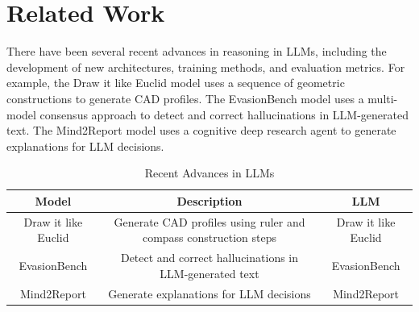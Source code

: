 \documentclass[11pt]{article}
\begin{document}
        \section{Related Work}
        \label{sec:related-work}
        There have been several recent advances in reasoning in LLMs, including the development of new architectures, training methods, and evaluation metrics. For example, the Draw it like Euclid model \cite{li2026drawlikeeuclidteaching} uses a sequence of geometric constructions to generate CAD profiles. The EvasionBench model \cite{ma2026evasionbenchdetectingevasiveanswers} uses a multi-model consensus approach to detect and correct hallucinations in LLM-generated text. The Mind2Report model \cite{cheng2026mind2reportcognitivedeepresearch} uses a cognitive deep research agent to generate explanations for LLM decisions.\\
        \begin{table}[h]
        \centering
        \begin{tabular}{|c|c|c|}
        \hline
        \textbf{Model} & \textbf{Description} & \textbf{LLM} \\
        \hline
        Draw it like Euclid & Generate CAD profiles using ruler and compass construction steps & Draw it like Euclid \cite{li2026drawlikeeuclidteaching} \\
        \hline
        EvasionBench & Detect and correct hallucinations in LLM-generated text & EvasionBench \cite{ma2026evasionbenchdetectingevasiveanswers} \\
        \hline
        Mind2Report & Generate explanations for LLM decisions & Mind2Report \cite{cheng2026mind2reportcognitivedeepresearch} \\
        \hline
        \end{tabular}
        \caption{Recent Advances in LLMs}
        \label{tab:recent-advances-in-llms}
        \end{table}
\end{document}
